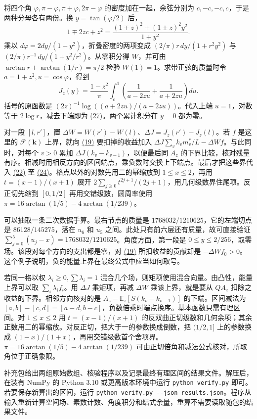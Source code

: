 \documentclass[11pt,a4paper]{article}
\begin{document}
将四个角 \(\varphi,\pi-\varphi,\pi+\varphi,2\pi-\varphi\) 的密度加在一起，余弦分别为 \(c,-c,-c,c\)，于是两种分母各有两份。换 \(y=\tan(\varphi/2)\) 后， \[
 1\mp2zc+z^2=\frac{(1\mp z)^2+(1\pm z)^2y^2}{1+y^2}.
\] 乘以 \(d\varphi=2dy/(1+y^2)\)，折叠密度的两项变成 \((2/\pi)r\,dy/(1+r^2y^2)\) 与 \((2/\pi)r^{-1}\,dy/(1+y^2/r^2)\)。从零积分得 \(W\)，并可由 \(\arctan r+\arctan(1/r)=\pi/2\) 检验 \(W(1)=1\)。求带正弦的质量时令 \(a=1+z^2,u=\cos\varphi\)，得到 \[
 J_z(y)=\frac{1-z^2}{\pi}\int_c^1
 \left(\frac1{a-2zu}+\frac1{a+2zu}\right)du .
\] 括号的原函数是 \((2z)^{-1}\log((a+2zu)/(a-2zu))\)。代入上端 \(u=1\)，对数等于 \(2\log r\)，减去下端即为 \hyperref[eq:27]{(27)}。两个累计积分在 \(y=0\) 都为零。

对一段 \([l,r']\)，置 \(\Delta W=W(r')-W(l)\)、\(\Delta J=J_z(r')-J_z(l)\)。若 \(f\) 是这里的 \(\mathcal F(\mathbf k)\) 上界，就向 \hyperref[eq:19]{(19)} 要扣掉的收益加入 \(\Delta J\sum_vk_vm_v^*/L-\Delta W f\)。与此同时，对每个 \(v>0\) 累加 \(\Delta J(k_v-k_{v-1})\)，以便最后同 \(A_z\) 的下界比较，核对残量有序。相减时用相反方向的区间端点，乘负数时交换上下端点。最后才把这些界代入 \hyperref[eq:22]{(22)} 至 \hyperref[eq:24]{(24)}。格点以外的对数先用二的幂缩放到 \(1\le x\le2\)，再用 \(t=(x-1)/(x+1)\) 展开 \(2\sum_{j\ge0}t^{2j+1}/(2j+1)\)，用几何级数界住尾项。反正切先缩到 \([0,1/2]\) 再用交错级数，圆周率使用 \(\pi=16\arctan(1/5)-4\arctan(1/239)\)。

可以抽取一条二次数据手算。最右节点的质量是 \(1768032/1210625\)，它的左端切点是 \(86128/145275\)，落在 \(u_6\) 和 \(u_5\) 之间。此处只有前六层还有质量，故可直接验证 \(\sum_{j=0}^5(u_j-x)=1768032/1210625\)。角度方面，第一段是 \(0\le y\le2/256\)，取零场。该段对每个方向的支出都是零，对 \hyperref[eq:19]{(19)} 所扣收益的贡献却是 \(-\Delta W f_0>0\)。这个例子说明，负的能量上界在最终公式中应当如何取号。

若同一格以权 \(\lambda_i\ge0,\sum\lambda_i=1\) 混合几个场，则矩项使用混合向量。由凸性，能量上界可以取 \(\sum_i\lambda_i f_i\)。用 \(\Delta J\) 乘矩项，再减 \(\Delta W\) 乘该上界，就是要从 \(QA_z\) 扣除之收益的下界。相邻方向核对的是 \(A_z-\mathbb E_z[S(k_v-k_{v-1})]\) 的下端。区间减法为 \([a,b]-[c,d]=[a-d,b-c]\)，负数倍乘时端点换序。基本函数只需有理区间。对 \(1\le x\le2\) 用 \(t=(x-1)/(x+1)\) 的反双曲正切级数和几何余项；其余正数用二的幂缩放。对反正切，把大于一的参数换成倒数，把 \((1/2,1]\) 上的参数换成 \((1-x)/(1+x)\)，再用交错级数首个舍项界。\(\pi=16\arctan(1/5)-4\arctan(1/239)\) 可由正切倍角和减法公式核对，所取角位于正确象限。

补充包给出两组原始数组、核验程序以及记录最终有理区间的结果文件。解压后，在装有 NumPy 的 Python 3.10 或更高版本环境中运行 \texttt{python\ verify.py} 即可。若要保存新算出的区间，运行 \texttt{python\ verify.py\ -\/-json\ results.json}。程序从输入重新计算空间场、素数计数、角度积分和结式余量，重算不需要读取随包的结果文件。
\end{document}
